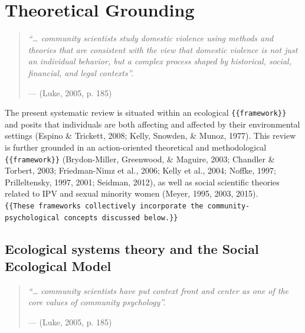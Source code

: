 \documentclass[11pt,]{tufte-book}
\begin{document}
\chapter{Theoretical Grounding}\label{theoretical-grounding}

\begin{quote}
\emph{``\ldots{} community scientists study domestic violence using
methods and theories that are consistent with the view that domestic
violence is not just an individual behavior, but a complex process
shaped by historical, social, financial, and legal contexts''.}

\hfill --- (Luke, 2005, p. 185)
\end{quote}

The present systematic review is situated within an ecological
\texttt{\{\{framework\}\}} and posits that individuals are both
affecting and affected by their environmental settings (Espino \&
Trickett, 2008; Kelly, Snowden, \& Munoz, 1977). This review is further
grounded in an action-oriented theoretical and methodological
\texttt{\{\{framework\}\}} (Brydon-Miller, Greenwood, \& Maguire, 2003;
Chandler \& Torbert, 2003; Friedman-Nimz et al., 2006; Kelly et al.,
2004; Noffke, 1997; Prilleltensky, 1997, 2001; Seidman, 2012), as well
as social scientific theories related to IPV and sexual minority women
(Meyer, 1995, 2003, 2015).
\texttt{\{\{These\ frameworks\ collectively\ incorporate\ the\ community-psychological\ concepts\ discussed\ below.\}\}}

\section{Ecological systems theory and the Social Ecological
Model}\label{ecological-systems-theory-and-the-social-ecological-model}

\begin{quote}
\emph{``\ldots{} community scientists have put context front and center
as one of the core values of community psychology''.}

\hfill --- (Luke, 2005, p. 185)
\end{quote}
\end{document}
